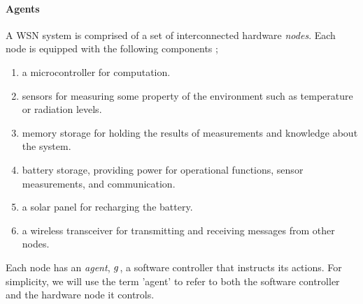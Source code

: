\paragraph{Agents}
A WSN system is comprised of a set of interconnected hardware \textit{nodes}. Each node is equipped with the following components \citep{muhammad_r_ahmed_2012_1072589};
\begin{enumerate}
	\item a microcontroller for computation.
	\item sensors for measuring some property of the environment such as temperature or radiation levels.
	\item memory storage for holding the results of measurements and knowledge about the system.
	\item battery storage, providing power for operational functions, sensor measurements, and communication.
	\item a solar panel for recharging the battery.
	\item  a wireless transceiver for  transmitting and receiving messages from other nodes.
\end{enumerate}

Each node has an \textit{agent}, $g_{}^{}$, a software controller that instructs its actions. For simplicity, we will use the term 'agent' to refer to both the software controller and the hardware node it controls.
